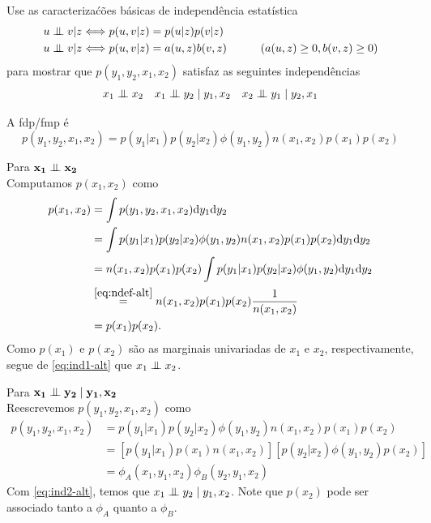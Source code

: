\begin{exenumerate}

\item Use as caracteriza\'c\~oes b\'asicas de independ\^encia estat\'istica
\begin{align}
    u \mathrel{\perp\mspace{-10mu}\perp} v | z &\Longleftrightarrow p(u,v | z) = p(u|z) p(v | z) \label{eq:ind1-alt}\\
    u \mathrel{\perp\mspace{-10mu}\perp} v | z &\Longleftrightarrow p(u,v | z) = a(u,z) b(v,z) \quad \quad \quad (a(u,z) \ge0, b(v,z) \ge 0) \label{eq:ind2-alt}
\end{align}
para mostrar que $p(y_1,y_2,x_1,x_2)$ satisfaz as seguintes independ\^encias
\begin{align*}
    x_1 \mathrel{\perp\mspace{-10mu}\perp} x_2 &&  x_1 \mathrel{\perp\mspace{-10mu}\perp} y_2 \mid y_1, x_2 && x_2 \mathrel{\perp\mspace{-10mu}\perp} y_1 \mid y_2, x_1
\end{align*}

\begin{solution}
    A fdp/fmp \'e
    $$p(y_1,y_2,x_1,x_2) = p(y_1 | x_1) p(y_2 | x_2) \phi(y_1,y_2) n(x_1,x_2) p(x_1) p(x_2)$$
    
    Para $\mathbf{x_1 \mathrel{\perp\mspace{-10mu}\perp} x_2}$\\
    Computamos $p(x_1,x_2)$ como
    \begin{align}
        p(x_1,x_2) & = \int p(y_1,y_2,x_1,x_2) \mathrm{d} y_1 \mathrm{d} y_2\\
        & =  \int p(y_1 | x_1) p(y_2 | x_2) \phi(y_1,y_2) n(x_1,x_2) p(x_1) p(x_2) \mathrm{d} y_1 \mathrm{d} y_2 \\
        & =  n(x_1,x_2) p(x_1) p(x_2) \int p(y_1 | x_1) p(y_2 | x_2) \phi(y_1,y_2) \mathrm{d} y_1 \mathrm{d} y_2\\
        & \stackrel{\eqref{eq:ndef-alt}}=  n(x_1,x_2) p(x_1) p(x_2) \frac{1}{n(x_1,x_2)}\\
        & = p(x_1) p(x_2).
    \end{align}
    Como $p(x_1)$ e $p(x_2)$ s\~ao as marginais univariadas de $x_1$ e $x_2$, respectivamente, segue de \eqref{eq:ind1-alt} que $x_1 \mathrel{\perp\mspace{-10mu}\perp} x_2$.
    
    \vspace{2ex}
    Para $\mathbf{x_1 \mathrel{\perp\mspace{-10mu}\perp} y_2 \mid y_1, x_2}$\\
    Reescrevemos $p(y_1,y_2,x_1,x_2)$ como
    \begin{align}
        p(y_1,y_2,x_1,x_2) & =  p(y_1 | x_1) p(y_2 | x_2) \phi(y_1,y_2) n(x_1,x_2) p(x_1) p(x_2)\\
        & =  \left[p(y_1 | x_1) p(x_1)  n(x_1,x_2)\right]\left[ p(y_2 | x_2)\phi(y_1,y_2)p(x_2)\right]\\
        & = \phi_A(x_1,y_1,x_2) \phi_B(y_2,y_1,x_2)
    \end{align}
    Com \eqref{eq:ind2-alt}, temos que $x_1 \mathrel{\perp\mspace{-10mu}\perp} y_2 \mid y_1,x_2$. Note que $p(x_2)$ pode ser associado tanto a $\phi_A$ quanto a $\phi_B$.
    

\end{solution}
\end{exenumerate}
